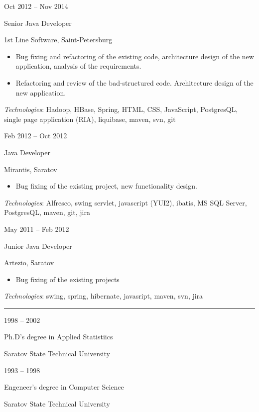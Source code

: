 \documentclass[a4paper,10pt]{article}
\newlength{\cvcolumngapwidth}
\newlength{\cvleftcolumnwidth}
\newlength{\cvrightcolumnwidth}
\newcommand{\cvsectionstyle}[1]{{\normalsize\cvsectionfont\textcolor{cvsectioncolor}{#1}}}
\newcommand{\cvtitlestyle}[1]{{\large\cvtitlefont\textcolor{cvtitlecolor}{#1}}}
\newcommand{\cvdurationstyle}[1]{{\small\cvdurationfont\textcolor{cvdurationcolor}{#1}}}
\newlength{\cvafteritemskipamount}
\newlength{\cvaftersectionskipamount}
\newlength{\cvaftertitleskipamount}
\newlength{\cvparskip}
\newcommand{\cvsection}[1]{
    \begin{minipage}[t]{\cvleftcolumnwidth}
        \raggedleft\cvsectionstyle{#1}
    \end{minipage}%
    \hspace{\cvcolumngapwidth}%
    \begin{minipage}[t]{\cvrightcolumnwidth}
        \textcolor{cvrulecolor}{\rule{\cvrightcolumnwidth}{0.3mm}}
    \end{minipage}

    \vspace{\cvaftersectionskipamount}
}
\newcommand{\cvitem}[2]{
    \begin{minipage}[t]{\cvleftcolumnwidth}
        \raggedleft #1
    \end{minipage}%
    \hspace{\cvcolumngapwidth}%
    \begin{minipage}[t]{\cvrightcolumnwidth}
        \setlength{\parskip}{\cvparskip} #2
    \end{minipage}

    \vspace{\cvafteritemskipamount}
}
\newcommand{\cvtitle}[1]{
    \cvtitlestyle{#1}

    \vspace{\cvaftertitleskipamount}
    \vspace{-\cvparskip}
}
\begin{document}
\cvitem{
    \cvdurationstyle{Oct 2012 -- Nov 2014}
}{
    \cvtitle{Senior Java Developer}

    1st Line Software, Saint-Petersburg
    
    \begin{itemize}[leftmargin=*]
        \item Bug fixing and refactoring of the existing code, architecture design of the new application, analysis of the requirements.
        \item Refactoring and review of the bad-structured code. Architecture design of the new application.
    \end{itemize}

    \textit{Technologies}: Hadoop, HBase, Spring, HTML, CSS, JavaScript, PostgresQL, single page application (RIA), liquibase, maven, svn, git
}
\cvitem{
    \cvdurationstyle{Feb 2012 -- Oct 2012}
}{
    \cvtitle{Java Developer}

    Mirantis, Saratov
    
    \begin{itemize}[leftmargin=*]
        \item Bug fixing of the existing project, new functionality design.
    \end{itemize}

    \textit{Technologies}: Alfresco, swing servlet, javascript (YUI2), ibatis, MS SQL Server, PostgresQL, maven, git, jira
}
\cvitem{
    \cvdurationstyle{May 2011 -- Feb 2012}
}{
    \cvtitle{Junior Java Developer}
    
    Artezio, Saratov
    
    \begin{itemize}[leftmargin=*]
        \item Bug fixing of the existing projects
    \end{itemize}

    \textit{Technologies}: swing, spring, hibernate, javasript, maven, svn, jira
}



\cvsection{EDUCATION}

\cvitem{
    \cvdurationstyle{1998 -- 2002}
}{
    \cvtitle{Ph.D's degree in Applied Statistiics}

    Saratov State Technical University

}
\cvitem{
    \cvdurationstyle{1993 -- 1998}
}{
    \cvtitle{Engeneer's degree in Computer Science}

    Saratov State Technical University

}
\end{document}
